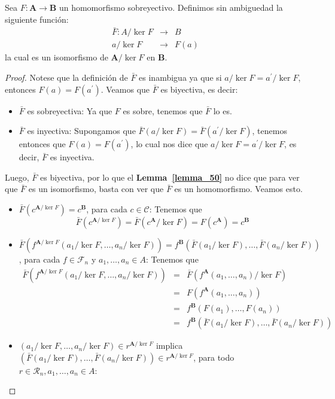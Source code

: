   \begin{theorem} \label{theorem_55}
    \PN Sea $F: \mathbf{A} \rightarrow \mathbf{B}$ un homomorfismo sobreyectivo. Definimos sin ambiguedad la siguiente
    función:
    \begin{eqnarray*}
      \bar{F}: A/\ker F &\rightarrow& B \\
      a/\ker F &\rightarrow& F(a)
    \end{eqnarray*}
    \PN la cual es un isomorfismo de $\mathbf{A}/\ker F$ en $\mathbf{B}$.
  \end{theorem}
  \begin{proof}
    \PN Notese que la definición de $\bar{F}$ es inambigua ya que si $a/\ker F = a^{\prime}/\ker F$, entonces $F(a) =
    F(a^{\prime})$. Veamos que $\bar{F}$ es biyectiva, es decir:
    \begin{itemize}
      \item $\bar{F}$ es sobreyectiva: Ya que $F$ es sobre, tenemos que $\bar{F}$ lo es.
      \item $\bar{F}$ es inyectiva: Supongamos que $\bar{F}(a/\ker F) = \bar{F}(a^{\prime}/\ker F)$, tenemos entonces
        que $F(a) = F(a^{\prime})$, lo cual nos dice que $a/\ker F = a^{\prime}/\ker F$, es decir, $\bar{F}$ es
        inyectiva.
    \end{itemize}
    \PN Luego, $\bar{F}$ es biyectiva, por lo que el \textbf{Lemma~\ref{lemma_50}} no dice que para ver que $\bar{F}$ es
    un isomorfismo, basta con ver que $\bar{F}$ es un homomorfismo. Veamos esto.
    \begin{itemize}
      \item $\bar{F}(c^{\mathbf{A}/\ker F}) = c^{\mathbf{B}}$, para cada $c \in \mathcal{C}$: Tenemos que
        \[
          \bar{F}(c^{\mathbf{A}/\ker F}) = \bar{F}(c^{\mathbf{A}}/\ker F) = F(c^{\mathbf{A} }) = c^{\mathbf{B}}
        \]
      \item $\bar{F}(f^{\mathbf{A}/\ker F}(a_{1}/\ker F, \dotsc, a_{n}/\ker F)) = f^{\mathbf{B}}(\bar{F}(a_{1}/\ker F), \dotsc,
        \bar{F}(a_{n}/\ker F))$, para cada $f \in \mathcal{F}_{n}$ y $a_{1}, \dotsc, a_{n} \in A$: Tenemos que
        \begin{eqnarray*}
          \bar{F}(f^{\mathbf{A}/\ker F}(a_{1}/\ker F, \dotsc, a_{n}/\ker F)) &=& \bar{F}(f^{\mathbf{A}}(a_{1}, \dotsc,
          a_{n})/\ker F) \\
          &=& F(f^{\mathbf{A}}(a_{1}, \dotsc, a_{n})) \\
          &=& f^{\mathbf{B}}(F(a_{1}), \dotsc, F(a_{n})) \\
          &=& f^{\mathbf{B}}(\bar{F}(a_{1}/\ker F), \dotsc, \bar{F}(a_{n}/\ker F))
        \end{eqnarray*}

      \item $(a_{1}/\ker F, \dotsc, a_{n}/\ker F) \in r^{\mathbf{A}/\ker F}$ implica $(\bar{F}(a_{1}/\ker F), \dotsc,
        \bar{F}(a_{n}/\ker F)) \in r^{\mathbf{A}/\ker F}$, para todo $r \in \mathcal{R}_{n}, a_{1}, \dotsc, a_{n} \in A$:
    \end{itemize}
  \end{proof}

